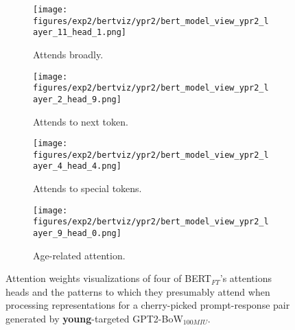 \begin{figure}[H]
     \centering
     \begin{subfigure}[b]{0.22\textwidth}
        \centering
        \texttt{[image: figures/exp2/bertviz/ypr2/bert\_model\_view\_ypr2\_layer\_11\_head\_1.png]}
        \captionsetup{font=footnotesize,labelfont=footnotesize}
        \caption{Attends broadly.}
        \label{subfig:bertviz_model_view_ypr2_broad}
     \end{subfigure}
     \quad
     \begin{subfigure}[b]{0.22\textwidth}
        \centering
        \texttt{[image: figures/exp2/bertviz/ypr2/bert\_model\_view\_ypr2\_layer\_2\_head\_9.png]}
        \captionsetup{font=footnotesize,labelfont=footnotesize}
        \caption{Attends to next token.}
        \label{subfig:bertviz_model_view_ypr2_next}
     \end{subfigure}
    \quad
    \begin{subfigure}[b]{0.22\textwidth}
        \centering
        \texttt{[image: figures/exp2/bertviz/ypr2/bert\_model\_view\_ypr2\_layer\_4\_head\_4.png]}
        \captionsetup{font=footnotesize,labelfont=footnotesize}
        \caption{Attends to special tokens.}
        \label{subfig:bertviz_model_view_ypr2_special}
     \end{subfigure}
    \quad
     \begin{subfigure}[b]{0.22\textwidth}
        \centering
        \texttt{[image: figures/exp2/bertviz/ypr2/bert\_model\_view\_ypr2\_layer\_9\_head\_0.png]}
        \captionsetup{font=footnotesize,labelfont=footnotesize}
        \caption{Age-related attention.}
        \label{subfig:bertviz_model_view_ypr2_age}
     \end{subfigure}
    \caption{Attention weights visualizations of four of BERT$_{FT}$'s attentions heads and the patterns to which they presumably attend when processing representations for a cherry-picked prompt-response pair generated by \textbf{young}-targeted GPT2-BoW$_{100MIU}$. }
    \label{fig:bertviz_model_view_ypr2}
\end{figure}

